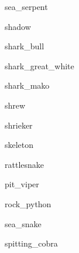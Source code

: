 \documentclass[letterpaper,serif]{module}
\begin{document}
\begin{newmonster}{sea_serpent}\end{newmonster}

\begin{newmonster}{shadow}\end{newmonster}

\begin{newmonster}{shark_bull}\end{newmonster}

\begin{newmonster}{shark_great_white}\end{newmonster}

\begin{newmonster}{shark_mako}\end{newmonster}

\begin{newmonster}{shrew}\end{newmonster}

\begin{newmonster}{shrieker}\end{newmonster}

\begin{newmonster}{skeleton}\end{newmonster}

\begin{newmonster}{rattlesnake}\end{newmonster}

\begin{newmonster}{pit_viper}\end{newmonster}

\begin{newmonster}{rock_python}\end{newmonster}

\begin{newmonster}{sea_snake}\end{newmonster}

\begin{newmonster}{spitting_cobra}\end{newmonster}
\end{document}
